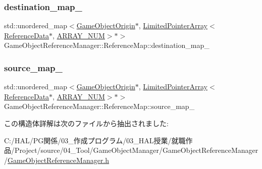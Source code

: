 \subsubsection{\texorpdfstring{destination\+\_\+map\+\_\+}{destination\_map\_}}
{\footnotesize\ttfamily std\+::unordered\+\_\+map$<$\mbox{\hyperlink{class_game_object_origin}{Game\+Object\+Origin}}$\ast$, \mbox{\hyperlink{class_limited_pointer_array}{Limited\+Pointer\+Array}}$<$\mbox{\hyperlink{struct_game_object_reference_manager_1_1_reference_data}{Reference\+Data}}$\ast$, \mbox{\hyperlink{class_game_object_reference_manager_a962d30b10c5b76353645773b2c1740ce}{A\+R\+R\+A\+Y\+\_\+\+N\+UM}}$>$$\ast$$>$ Game\+Object\+Reference\+Manager\+::\+Reference\+Map\+::destination\+\_\+map\+\_\+}

\mbox{\label{struct_game_object_reference_manager_1_1_reference_map_a0ee4351e9e65be2e72a47a97dc116af3}} 
\subsubsection{\texorpdfstring{source\+\_\+map\+\_\+}{source\_map\_}}
{\footnotesize\ttfamily std\+::unordered\+\_\+map$<$\mbox{\hyperlink{class_game_object_origin}{Game\+Object\+Origin}}$\ast$, \mbox{\hyperlink{class_limited_pointer_array}{Limited\+Pointer\+Array}}$<$\mbox{\hyperlink{struct_game_object_reference_manager_1_1_reference_data}{Reference\+Data}}$\ast$, \mbox{\hyperlink{class_game_object_reference_manager_a962d30b10c5b76353645773b2c1740ce}{A\+R\+R\+A\+Y\+\_\+\+N\+UM}}$>$$\ast$$>$ Game\+Object\+Reference\+Manager\+::\+Reference\+Map\+::source\+\_\+map\+\_\+}



この構造体詳解は次のファイルから抽出されました\+:\begin{DoxyCompactItemize}
\item 
C\+:/\+H\+A\+L/\+P\+G関係/03\+\_\+作成プログラム/03\+\_\+\+H\+A\+L授業/就職作品/\+Project/source/04\+\_\+\+Tool/\+Game\+Object\+Manager/\+Game\+Object\+Reference\+Manager/\mbox{\hyperlink{_game_object_reference_manager_8h}{Game\+Object\+Reference\+Manager.\+h}}\end{DoxyCompactItemize}
